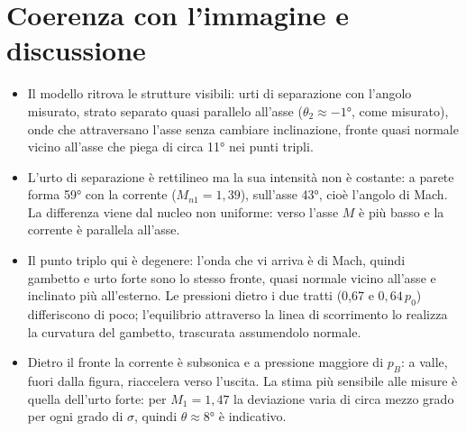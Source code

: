 \documentclass[11pt,a4paper]{article}
\begin{document}
\section{Coerenza con l'immagine e discussione}
\begin{itemize}
\item Il modello ritrova le strutture visibili: urti di separazione con l'angolo misurato, strato separato quasi
  parallelo all'asse ($\theta_2\approx\ang{-1}$, come misurato), onde che attraversano l'asse senza cambiare
  inclinazione, fronte quasi normale vicino all'asse che piega di circa \ang{11} nei punti tripli.
\item L'urto di separazione è rettilineo ma la sua intensità non è costante: a parete forma \ang{59} con la corrente
  ($M_{n1}=1{,}39$), sull'asse \ang{43}, cioè l'angolo di Mach. La differenza viene dal nucleo non uniforme: verso
  l'asse $M$ è più basso e la corrente è parallela all'asse.
\item Il punto triplo qui è degenere: l'onda che vi arriva è di Mach, quindi gambetto e urto forte sono lo stesso fronte,
  quasi normale vicino all'asse e inclinato più all'esterno. Le pressioni dietro i due tratti (0,67 e $0{,}64\,p_0$)
  differiscono di poco; l'equilibrio attraverso la linea di scorrimento lo realizza la curvatura del gambetto,
  trascurata assumendolo normale.
\item Dietro il fronte la corrente è subsonica e a pressione maggiore di $p_B$: a valle, fuori dalla figura, riaccelera
  verso l'uscita. La stima più sensibile alle misure è quella dell'urto forte: per $M_1=1{,}47$ la deviazione varia di
  circa mezzo grado per ogni grado di $\sigma$, quindi $\theta\approx\ang{8}$ è indicativo.
\end{itemize}
\end{document}
